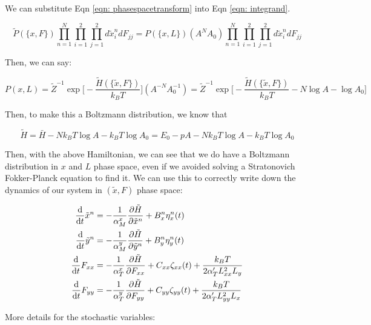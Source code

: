 \documentclass[12pt]{article}
\begin{document}
We can substitute Eqn \ref{eqn: phasespacetransform} into Eqn \ref{eqn: integrand}.
\begin{center}
\begin{equation}
\tilde{P}(\{x, F\}) \prod\limits_{n=1}^N \prod\limits_{i=1}^{2} \prod\limits_{j=1}^{2} d\tilde{x}_i^n dF_{jj} = P(\{x,L\}) (A^N A_0) \prod\limits_{n=1}^N \prod\limits_{i=1}^{2} \prod\limits_{j=1}^{2} d\tilde{x}_i^n dF_{jj}
\end{equation}
\end{center}
Then, we can say:
\begin{center}
\begin{equation}
P({x,L}) = \tilde{Z}^{-1} \exp\bigg[-\frac{\tilde{H}(\{\tilde{x}, F\})}{k_B T}\bigg] (A^{-N} A_0^{-1}) = \tilde{Z}^{-1} \exp\bigg[-\frac{\tilde{H}(\{\tilde{x}, F\})}{k_B T} - N \log A - \log A_0\bigg]
\end{equation}
\end{center}
Then, to make this a Boltzmann distribution, we know that
\begin{center}
\begin{equation}
\tilde{H} = \bar{H} - N k_B T \log A - k_B T \log A_0 = E_0 - pA - N k_B T \log A - k_B T \log A_0
\end{equation}
\end{center}
Then, with the above Hamiltonian, we can see that we do have a Boltzmann distribution in $x$ and $L$ phase space, even if we avoided solving a Stratonovich Fokker-Planck equation to find it. We can use this to correctly write down the dynamics of our system in $(\tilde{x}, F)$ phase space:
\begin{center}
\begin{equation}
\label{eqn: dyn}
\begin{split}
\dv{t} \tilde{x}^n &= -\frac{1}{\alpha_M^x} \pdv{\tilde{H}}{\tilde{x}^n} + B_x^n \eta_x^n(t)\\  
\dv{t} \tilde{y}^n &= -\frac{1}{\alpha_M^y}\pdv{\tilde{H}}{\tilde{y}^n} + B_y^n \eta_y^n(t)\\
\dv{t} F_{xx} &= -\frac{1}{\alpha_T^x}\pdv{\tilde{H}}{F_{xx}} + C_{xx} \zeta_{xx}(t) + \frac{k_B T}{2 \alpha_T' L_{xx}^2 L_y}\\
\dv{t} F_{yy} &= -\frac{1}{\alpha_T^y} \pdv{\tilde{H}}{F_{yy}} + C_{yy} \zeta_{yy}(t) + \frac{k_B T}{2 \alpha_T' L_{yy}^2 L_x} \\
\end{split}
\end{equation}
\end{center}
More details for the stochastic variables:
\end{document}
